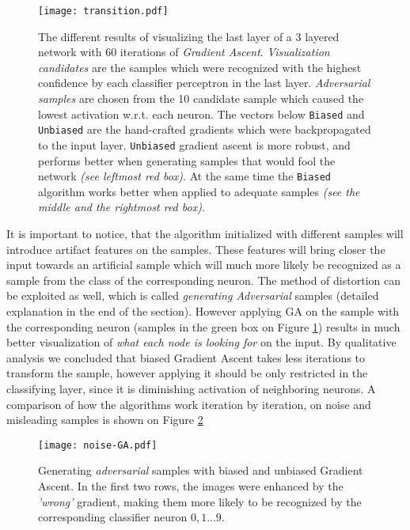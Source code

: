 \begin{figure}
    \centering
    \texttt{[image: transition.pdf]}
    \caption{
        The different results of visualizing the last layer of a 3 layered network with 60 iterations of \emph{Gradient Ascent}. 
        \emph{Visualization candidates} are the samples which were recognized with the highest confidence by each classifier perceptron in the last layer.
        \emph{Adversarial samples} are chosen from the 10 candidate sample which caused the lowest activation w.r.t. each neuron.
        The vectors below \texttt{Biased} and \texttt{Unbiased} are the hand-crafted gradients which were backpropagated to the input layer.
        \texttt{Unbiased} gradient ascent is more robust, and performs better when generating samples that would fool the network \emph{(see leftmost red box)}.
        At the same time the \texttt{Biased} algorithm works better when applied to adequate samples \emph{(see the middle and the rightmost red box)}.
    }
    \label{fig:bias-nobias}
\end{figure}
It is important to notice, that the algorithm initialized with different samples will introduce artifact features on the samples. 
These features will bring closer the input towards an artificial sample which will much more likely be recognized as a sample from the class of the corresponding neuron. 
The method of distortion can be exploited as well, which is called \emph{generating Adversarial} samples (detailed explanation in the end of the section).
However applying GA on the sample with the corresponding neuron (samples in the green box on Figure \ref{fig:bias-nobias}) results in much better visualization of \emph{what each node is looking for} on the input.
By qualitative analysis we concluded that biased Gradient Ascent takes less iterations to transform the sample, 
however applying it should be  only restricted in the classifying layer, since it is diminishing activation of neighboring neurons. 
A comparison of how the algorithms work iteration by iteration, on noise and misleading samples is shown on Figure \ref{fig:noise-GA}
    

\begin{figure}
    \centering
    \texttt{[image: noise-GA.pdf]}
    \caption{Generating \emph{adversarial} samples with biased and unbiased Gradient Ascent. 
    In the first two rows, the images were enhanced by the \emph{'wrong'} gradient, making them more likely to be recognized by the corresponding classifier neuron
    $0, 1 ... 9$.
    }
    \label{fig:noise-GA}
\end{figure}

